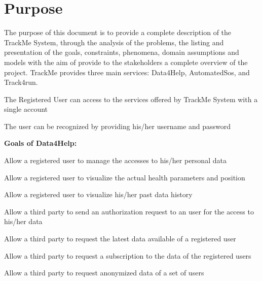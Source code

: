 \section{Purpose}
The purpose of this document is to provide a complete description of the TrackMe System, through the analysis of the problems, the listing and presentation of the goals, constraints, phenomena, domain assumptions and models with the aim of provide to the stakeholders a complete overview of the project. TrackMe provides three main services: Data4Help, AutomatedSos, and Track4run.

\begin{goalList}
\begin{enumerate}[label={[}G\arabic*{]}]

    \item \label{goal:trackme1} The Registered User can access to the services offered by TrackMe System with a single account
    
    
    \item \label{goal:trackme2}The user can be recognized by providing his/her username and password
    
    
\end{enumerate}

\textbf{Goals of Data4Help:}
\begin{enumerate}[label={[}G3.\arabic*{]}]

    \item \label{goal:user1}Allow a registered user to manage the accesses to his/her personal data
    \item \label{goal:user2}Allow a registered user to visualize the actual health parameters and position
    \item \label{goal:user3}Allow a registered user to visualize his/her past data history

    \item \label{goal:parties1}Allow a third party to send an authorization request to an user for the access to his/her data
    \item \label{goal:parties2}Allow a third party to  request the latest data available  of a registered user

    \item \label{goal:parties3}Allow a third party to request a subscription to the data of the registered users

    \item \label{goal:parties4}Allow a third party to request anonymized data of a set of users


\end{enumerate}
\end{goalList}
